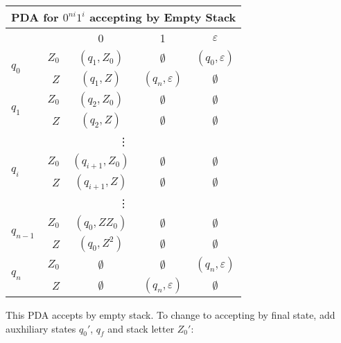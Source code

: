 \begin{center}\begin{tabular}{l r c c c}
    \multicolumn{5}{c}{PDA for \(0^{ni} 1^i\) accepting by Empty Stack}\\\bottomrule
    & & 0 & 1 & \(\varepsilon \) \\\cmidrule{3-5}
    \multirow{2}{*}{\(q_0\)} & \(Z_0\) & \((q_1, Z_0)\) & \(\emptyset \) & \((q_0, \varepsilon)\) \\
    & \(Z\) & \((q_1, Z)\) & \((q_n, \varepsilon) \) & \(\emptyset \) \\\midrule
    \multirow{2}{*}{\(q_1\)} & \(Z_0\) & \((q_2, Z_0)\) & \(\emptyset \) & \(\emptyset \) \\
    & \(Z\) & \((q_2, Z) \)  & \(\emptyset \) & \(\emptyset \) \\\midrule
    \multicolumn{5}{c}{\vdots}\\\midrule
    \multirow{2}{*}{\(q_i\)} & \(Z_0\) & \((q_{i+1}, Z_0)\) & \(\emptyset \) &  \(\emptyset \) \\
    & \(Z\) & \((q_{i+1}, Z) \) & \(\emptyset \) & \(\emptyset \) \\\midrule
    \multicolumn{5}{c}{\vdots}\\\midrule
    \multirow{2}{*}{\(q_{n-1}\)} & \(Z_0\) & \((q_0, ZZ_0)\) & \(\emptyset \) & \(\emptyset \) \\
    & \(Z\)  & \((q_0, Z^2) \) & \(\emptyset \) & \(\emptyset \) \\\midrule
    \multirow{2}{*}{\(q_n\)} & \(Z_0\) & \(\emptyset \) & \(\emptyset \) & \((q_n, \varepsilon)\) \\
    & \(Z\) & \(\emptyset \)  & \((q_n, \varepsilon ) \) &  \(\emptyset \) \\\midrule
\end{tabular}\end{center}

This PDA accepts by empty stack. To change to accepting by final state, add auxhiliary states \(q_0'\), \(q_f\) and stack letter \(Z_0'\):

